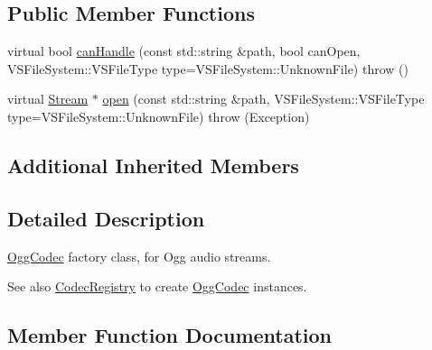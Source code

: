 \subsection*{Public Member Functions}
\begin{DoxyCompactItemize}
\item 
virtual bool \hyperlink{classAudio_1_1FFCodec_ab13399f816a4665befa72222aba6c81e}{can\+Handle} (const std\+::string \&path, bool can\+Open, V\+S\+File\+System\+::\+V\+S\+File\+Type type=V\+S\+File\+System\+::\+Unknown\+File)  throw ()
\item 
virtual \hyperlink{classAudio_1_1Stream}{Stream} $\ast$ \hyperlink{classAudio_1_1FFCodec_aa8e9f3e49b9bb3634302642805a3630a}{open} (const std\+::string \&path, V\+S\+File\+System\+::\+V\+S\+File\+Type type=V\+S\+File\+System\+::\+Unknown\+File)  throw (\+Exception)
\end{DoxyCompactItemize}
\subsection*{Additional Inherited Members}


\subsection{Detailed Description}
\hyperlink{classAudio_1_1OggCodec}{Ogg\+Codec} factory class, for Ogg audio streams. \begin{DoxySeeAlso}{See also}
\hyperlink{classAudio_1_1CodecRegistry}{Codec\+Registry} to create \hyperlink{classAudio_1_1OggCodec}{Ogg\+Codec} instances. 
\end{DoxySeeAlso}


\subsection{Member Function Documentation}
